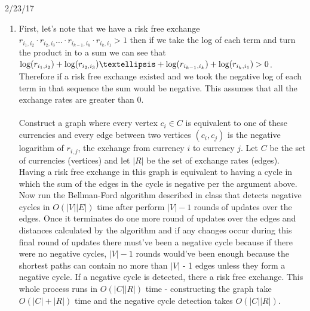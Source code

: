 \documentclass{article}
\begin{document}
	
 \hspace{5.5in} 2/23/17\\

\begin{enumerate}
	\item First, let's note that we have a risk free exchange $r_{i_1,i_2}\cdot r_{i_2,i_3} … \cdot r_{i_{k-1},i_k} \cdot r_{i_k,i_1} > 1$ then if we take the log of each term and turn the product in to a sum we can see that $\textup{log}(r_{i_1,i_2})+ \textup{log}(r_{i_2,i_3})… + \textup{log}(r_{i_{k-1},i_k}) + \textup{log}(r_{i_k,i_1}) > 0$.  Therefore if a risk free exchange existed and we took the negative log of each term in that sequence the sum would be negative.  This assumes that all the exchange rates are greater than 0.   \\\\
	Construct a graph where every vertex $c_i \in C$ is equivalent to one of these currencies and every edge between two vertices $(c_i, c_j)$ is the negative logarithm of $r_{i,j}$, the exchange from currency $i$ to currency $j$. Let $C$ be the set of currencies (vertices) and let $|R|$ be the set of exchange rates (edges). Having a risk free exchange in this graph is equivalent to having a cycle in which the sum of the edges in the cycle is negative per the argument above.  Now run the Bellman-Ford algorithm described in class that detects negative cycles in $O(|V||E|)$ time after perform $|V|-1$ rounds of updates over the edges.  Once it terminates do one more round of updates over the edges and distances calculated by the algorithm and if any changes occur during this final round of updates there must've been a negative cycle because if there were no negative cycles, $|V|-1$ rounds would've been enough because the shortest paths can contain no more than $|V|$ - 1 edges unless they form a negative cycle.  If a negative cycle is detected, there a risk free exchange.  This whole process runs in $O(|C||R|)$ time - constructing the graph take $O(|C|+|R|)$ time and the negative cycle detection takes $O(|C||R|)$.
	

\end{enumerate}
\end{document}
